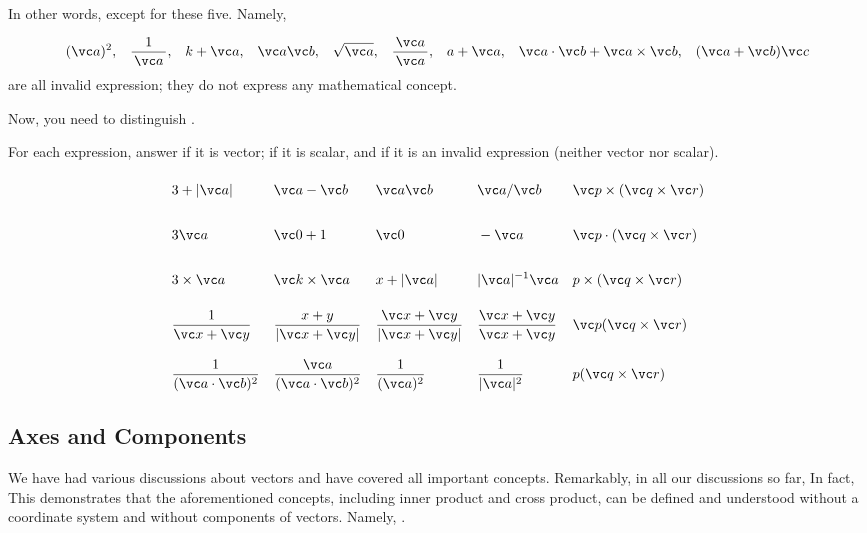 \documentclass[11pt,pdfa,lastpage]{MishoNote}
\begin{document}
In other words,  except for these five. Namely,
{
\color{AltDefA}
\begin{align*}
   (\vc a)^2,
 && \frac{1}{\,\vc a\,},
 && k+\vc a,
 && \vc a\vc b,
 && \sqrt{\vc a},
 && \frac{\vc a}{\,\vc a\,},
 && a+\vc a,
 && \vc a\cdot\vc b+\vc a\times\vc b,
 && (\vc a+\vc b)\vc c
\end{align*}
}
are all invalid expression; they do not express any mathematical concept.

Now, you need to distinguish .
\begin{problems}
\Problem[S] For each expression, answer  if it is vector;  if it is scalar, and  if it is an invalid expression (neither vector nor scalar).\\
\begin{align*}\def\baselinestretch{2}
  & 3+|\vc a|
  && \vc a-\vc b
  && \vc a\vc b
  && \vc a/\vc b
  && \vc p\times(\vc q\times\vc r)
\\[.5em]& 3\vc a
  && \vc 0+1
  && \vc 0
  && -\vc a
  && \vc p\cdot(\vc q\times\vc r)
\\[.5em]& 3\times\vc a
  && \vc k\times\vc a
  && x+|\vc a|
  && |\vc a|^{-1}\vc a
  && p\times(\vc q\times\vc r)
\\[.5em]& \frac{1}{\vc x+\vc y}
  && \frac{x+y}{|\vc x+\vc y|}
  && \frac{\vc x+\vc y}{|\vc x+\vc y|}
  && \frac{\vc x+\vc y}{\vc x+\vc y}
  && \vc p(\vc q\times\vc r)
\\[.5em]& \frac{1}{(\vc a\cdot\vc b)^2}
  && \frac{\vc a}{(\vc a\cdot\vc b)^2}
  && \frac{1}{(\vc a)^2}
  && \frac{1}{|\vc a|^2}
  && p(\vc q\times\vc r)
\end{align*}
\end{problems}

\newpage
\subsection{Axes and Components}

We have had various discussions about vectors and have covered all important concepts.
Remarkably, in all our discussions so far, 
In fact, 
This demonstrates that the aforementioned concepts, including inner product and cross product, can be defined and understood without a coordinate system and without components of vectors.
Namely, .
\end{document}
